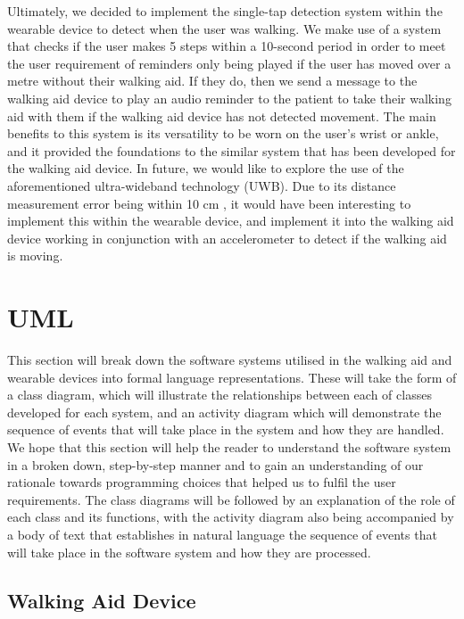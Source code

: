            Ultimately, we decided to implement the single-tap detection system within the wearable device to detect when the user was walking. We make use of a system that checks if the user makes 5 steps within a 10-second period in order to meet the user requirement of reminders only being played if the user has moved over a metre without their walking aid. If they do, then we send a message to the walking aid device to play an audio reminder to the patient to take their walking aid with them if the walking aid device has not detected movement. The main benefits to this system is its versatility to be worn on the user's wrist or ankle, and it provided the foundations to the similar system that has been developed for the walking aid device. In future, we would like to explore the use of the aforementioned ultra-wideband technology (UWB). Due to its distance measurement error being within 10 cm \cite{uwb_accuracy}, it would have been interesting to implement this within the wearable device, and implement it into the walking aid device working in conjunction with an accelerometer to detect if the walking aid is moving.

    \section{UML}
    \label{sec:uml}
    
        This section will break down the software systems utilised in the walking aid and wearable devices into formal language representations. These will take the form of a class diagram, which will illustrate the relationships between each of classes developed for each system, and an activity diagram which will demonstrate the sequence of events that will take place in the system and how they are handled. We hope that this section will help the reader to understand the software system in a broken down, step-by-step manner and to gain an understanding of our rationale towards programming choices that helped us to fulfil the user requirements. The class diagrams will be followed by an explanation of the role of each class and its functions, with the activity diagram also being accompanied by a body of text that establishes in natural language the sequence of events that will take place in the software system and how they are processed.

        \subsection{Walking Aid Device}
        \label{subsec:walking_aid_device_uml}

